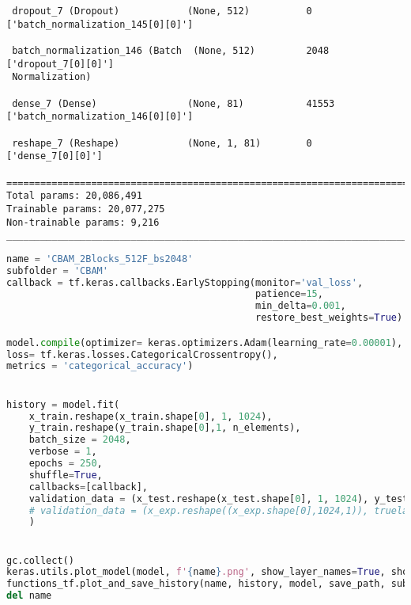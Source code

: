 \begin{lstlisting}
 dropout_7 (Dropout)            (None, 512)          0           ['batch_normalization_145[0][0]']
                                                                                                  
 batch_normalization_146 (Batch  (None, 512)         2048        ['dropout_7[0][0]']              
 Normalization)                                                                                   
                                                                                                  
 dense_7 (Dense)                (None, 81)           41553       ['batch_normalization_146[0][0]']
                                                                                                  
 reshape_7 (Reshape)            (None, 1, 81)        0           ['dense_7[0][0]']                
                                                                                                  
==================================================================================================
Total params: 20,086,491
Trainable params: 20,077,275
Non-trainable params: 9,216
__________________________________________________________________________________________________
\end{lstlisting}

\begin{lstlisting}[language=Python]
name = 'CBAM_2Blocks_512F_bs2048'
subfolder = 'CBAM'
callback = tf.keras.callbacks.EarlyStopping(monitor='val_loss', 
                                            patience=15,
                                            min_delta=0.001,
                                            restore_best_weights=True)

model.compile(optimizer= keras.optimizers.Adam(learning_rate=0.00001),
loss= tf.keras.losses.CategoricalCrossentropy(),
metrics = 'categorical_accuracy')


history = model.fit(
    x_train.reshape(x_train.shape[0], 1, 1024),
    y_train.reshape(y_train.shape[0],1, n_elements),
    batch_size = 2048,
    verbose = 1,
    epochs = 250,
    shuffle=True,
    callbacks=[callback],
    validation_data = (x_test.reshape(x_test.shape[0], 1, 1024), y_test.reshape(y_test.shape[0],1, n_elements))
    # validation_data = (x_exp.reshape((x_exp.shape[0],1024,1)), truelabels.reshape(213, 81)),
    )


gc.collect()
keras.utils.plot_model(model, f'{name}.png', show_layer_names=True, show_layer_activations=True, show_shapes=True)
functions_tf.plot_and_save_history(name, history, model, save_path, subfolder=subfolder)
del name
\end{lstlisting}

